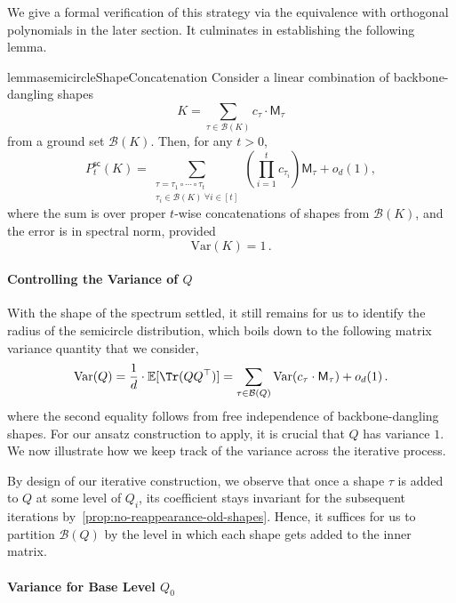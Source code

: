 \documentclass[12pt]{article}
\def \E {\mathbb{E}}
\newcommand{\Var}{\mathrm{Var}}
\newcommand{\calB}{\mathcal{B}}
\newcommand{\cm}{\mathsf{M} }
\begin{document}
    We give a formal verification of this strategy via the equivalence with orthogonal polynomials in the later section. It culminates in establishing the following lemma.
    \begin{restatable}{lemma}{semicircleShapeConcatenation}
\label{lem:semicircle-shape-concatenation}
Consider a linear combination of backbone-dangling shapes 
\[
    K=\sum_{\tau\in\mathcal B(K)} c_\tau \cdot \cm_\tau
\]
from a ground set $\calB(K)$.
Then, for any $t>0 $,
\[
    P^{\mathsf{sc}}_t(K)
    =
    \sum_{\substack{
        \tau=\tau_1\circ\cdots\circ\tau_t\\
        \tau_i\in\mathcal B(K)\ \forall i\in[t]
    }}
    \left(\prod_{i=1}^{t} c_{\tau_i}\right)\cm_\tau
    + o_d(1),
\]
where the sum is over proper \(t\)-wise concatenations of shapes from
\(\mathcal B(K)\), and the error is in spectral norm, provided \[ 
\Var(K) = 1 \,.
\]

\end{restatable}

    
 \paragraph{Controlling the Variance of \texorpdfstring{$Q$}{Q}}   
 With the shape of the spectrum settled, it still remains for us to identify the radius of the semicircle distribution, which boils down to the following matrix variance quantity that we consider, \[ 
 \Var(Q) = \frac{1}{d}\cdot  \E[\Tr(QQ^\top)] = \sum_{\tau \in \calB(Q)} \Var(c_\tau \cdot \cm_\tau) +o_d(1)\,.  \] 
 where the second equality follows from free independence of backbone-dangling shapes. For our ansatz construction to apply, it is crucial that $Q$ has variance $1$. We now illustrate how we keep track of the variance across the iterative process.
 
 
 
By design of our iterative construction, we observe that once a shape $\tau$ is added to $Q$ at some level of $Q_i$, its coefficient stays invariant for the subsequent iterations by~\cref{prop:no-reappearance-old-shapes}. Hence, it suffices for us to partition $\calB(Q)$ by the level in which each shape gets added to the inner matrix.

\paragraph{Variance for Base Level $Q_0$}
\end{document}
